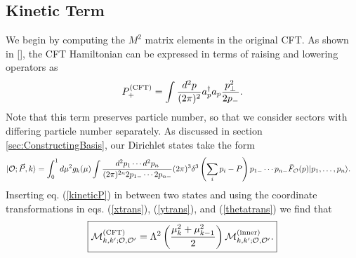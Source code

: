 \begin{subappendices}

\subsection{Kinetic Term} We begin by computing the $M^2$ matrix elements in the original CFT. As shown in [], the CFT Hamiltonian can be expressed in terms of raising and lowering operators as \begin{equation}
	P_+^{(\textrm{CFT})} = \int \frac{d^2 p}{(2\pi)^2} a^\dagger_p a_p \frac{p_\bot^2}{2p_-}. \label{kineticP}
\end{equation} Note that this term preserves particle number, so that we consider sectors with differing particle number separately. As discussed in section \ref{sec:ConstructingBasis}, our Dirichlet states take the form \begin{equation}
	\begin{aligned}
		|{\cal O}; \vec{P}, k\rangle &= \int_0^{1} d\mu^2 g_k(\mu) \int \frac{d^2p_1 \dotsb d^2p_n}{(2\pi)^{2n} 2p_{1-} \dotsb 2p_{n-}} (2\pi)^3 \delta^3\left(\sum_i p_i - P \right) p_{1-} \dotsb p_{n-} \bar{F}_{{\cal O}}(p) |p_1, \dots, p_n\rangle.
	\end{aligned}
\end{equation} Inserting eq. (\ref{kineticP}) in between two states and using the coordinate transformations in eqs. (\ref{xtrans}), (\ref{ytrans}), and (\ref{thetatrans}) we find that \begin{equation}
	\begin{aligned}
		\boxed{{\cal M}^{(\textrm{CFT})}_{k, k'; {\cal O}, {\cal O}'} = \Lambda^2 \left( \frac{\mu_k^2 + \mu_{k-1}^2}{2} \right) {\cal M}^{(\textrm{inner})}_{k, k'; {\cal O}, {\cal O}'}.}
	\end{aligned}
\end{equation}


\end{subappendices}
